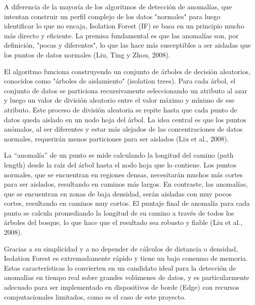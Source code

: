 
A diferencia de la mayoría de los algoritmos de detección de anomalías, que intentan construir un perfil complejo de los datos "normales" para luego identificar lo que no encaja, Isolation Forest (IF) se basa en un principio mucho más directo y eficiente. La premisa fundamental es que las anomalías son, por definición, "pocas y diferentes", lo que las hace más susceptibles a ser aisladas que los puntos de datos normales (Liu, Ting y Zhou, 2008).

El algoritmo funciona construyendo un conjunto de árboles de decisión aleatorios, conocidos como "árboles de aislamiento" (isolation trees). Para cada árbol, el conjunto de datos se particiona recursivamente seleccionando un atributo al azar y luego un valor de división aleatorio entre el valor máximo y mínimo de ese atributo. Este proceso de división aleatoria se repite hasta que cada punto de datos queda aislado en un nodo hoja del árbol. La idea central es que los puntos anómalos, al ser diferentes y estar más alejados de las concentraciones de datos normales, requerirán menos particiones para ser aislados (Liu et al., 2008).

La ``anomalía'' de un punto se mide calculando la longitud del camino (path length) desde la raíz del árbol hasta el nodo hoja que lo contiene. Los puntos normales, que se encuentran en regiones densas, necesitarán muchos más cortes para ser aislados, resultando en caminos más largos. En contraste, las anomalías, que se encuentran en zonas de baja densidad, serán aisladas con muy pocos cortes, resultando en caminos muy cortos. El puntaje final de anomalía para cada punto se calcula promediando la longitud de su camino a través de todos los árboles del bosque, lo que hace que el resultado sea robusto y fiable (Liu et al., 2008).

Gracias a su simplicidad y a no depender de cálculos de distancia o densidad, Isolation Forest es extremadamente rápido y tiene un bajo consumo de memoria. Estas características lo convierten en un candidato ideal para la detección de anomalías en tiempo real sobre grandes volúmenes de datos, y es particularmente adecuado para ser implementado en dispositivos de borde (Edge) con recursos computacionales limitados, como es el caso de este proyecto.




